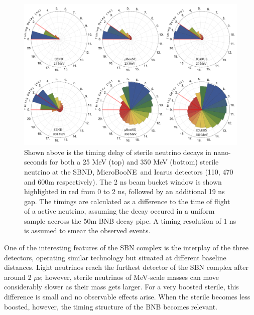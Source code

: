 \documentclass[11pt, a4paper]{article}
\def\muboone{MicroBooNE}
\begin{document}
\begin{figure}[t]
%
\center
%
\includegraphics[width=\textwidth]{figures/timing.pdf}
%
\caption{\label{fig:timing} Shown above is the timing delay of sterile neutrino
decays in nano-seconds for both a 25 MeV (top) and 350 MeV (bottom) sterile
neutrino at the SBND, \muboone\ and Icarus detectors (110, 470 and 600m
respectively). The 2 ns beam bucket window is shown highlighted in red from 0
to 2 ns, followed by an additional 19 ns gap. The timings are calculated as a
difference to the time of flight of a active neutrino, assuming the decay
occured in a uniform sample accross the 50m BNB decay pipe. A timing resolution
of 1 ns is assumed to smear the observed events.}
%
\end{figure}

One of the interesting features of the SBN complex is the interplay of the
three detectors, operating similar technology but situated at different
baseline distances.
%
Light neutrinos reach the furthest detector of the SBN complex after around 2
$\mu$s; however, sterile neutrinos of MeV-scale masses can move considerably
slower as their mass gets larger. For a very boosted sterile, this difference
is small and no observable effects arise. When the sterile becomes less
boosted, however, the timing structure of the BNB becomes relevant.
\end{document}
